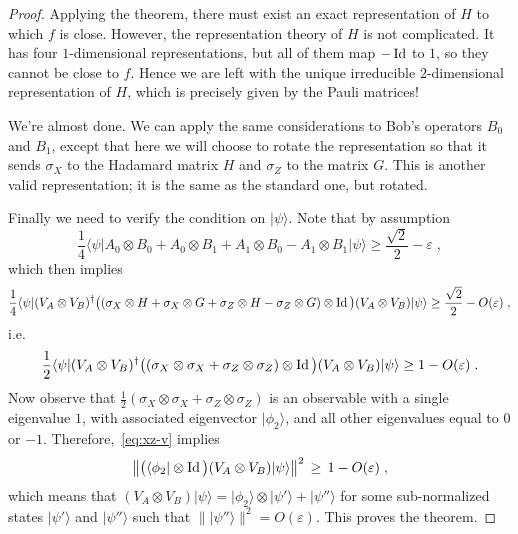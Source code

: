 \documentclass{report}
\theoremstyle{plain}
\theoremstyle{definition}
\theoremstyle{remark}
\newcommand{\ket}[1]{|#1\rangle}
\newcommand{\bra}[1]{\langle#1|}
\newcommand{\Id}{\ensuremath{\mathop{\rm Id}\nolimits}}
\newcommand{\eps}{\varepsilon}
\numberwithin{equation}{subsection}
\begin{document}
\begin{proof}
Applying the theorem, there must exist an exact representation of $H$ to which $f$ is close. However, the representation theory of $H$ is not complicated. It has four $1$-dimensional representations, but all of them map $-\Id$ to $1$, so they cannot be close to $f$. Hence we are left with the unique irreducible $2$-dimensional representation of $H$, which is precisely given by the Pauli matrices!

We're almost done. We can apply the  same considerations to Bob's operators $B_0$ and $B_1$, except that here we will choose to rotate the representation so that it sends $\sigma_X$ to the Hadamard matrix $H$ and $\sigma_Z$ to the matrix $G$. This is another valid representation; it is the same as the standard one, but rotated. 

Finally we need to verify the condition on $\ket{\psi}$. Note that by assumption 
$$ \frac{1}{4}\bra{\psi} A_0 \otimes B_0 + A_0 \otimes B_1 + A_1 \otimes B_0 - A_1\otimes B_1 \ket{\psi} \geq \frac{\sqrt{2}}{2} - \eps\;,$$
which then implies 
$$ \frac{1}{4} \bra{\psi}(V_A\otimes V_B)^\dagger \big( (\sigma_X \otimes H + \sigma_X \otimes G + \sigma_Z \otimes H - \sigma_Z\otimes G)\otimes\Id\big) (V_A\otimes V_B)\ket{\psi} \geq \frac{\sqrt{2}}{2} - O({\eps})\;,$$
i.e. 
\begin{equation}\label{eq:xz-v}
\frac{1}{2}\bra{\psi}(V_A\otimes V_B)^\dagger \big( (\sigma_X \otimes \sigma_X + \sigma_Z \otimes \sigma_Z )\otimes \Id\big)(V_A\otimes V_B)\ket{\psi} \geq 1 - O({\eps})\;.
\end{equation}
Now observe that $\frac{1}{2}(\sigma_X \otimes \sigma_X + \sigma_Z \otimes \sigma_Z )$ is an observable with a single eigenvalue $1$, with associated eigenvector $\ket{\phi_2}$, and all other eigenvalues equal to $0$ or $-1$. Therefore,~\eqref{eq:xz-v} implies 
\[ \big\|\big(\bra{\phi_2}\otimes \Id\big)(V_A\otimes V_B)|\psi\rangle\big\|^2 \,\geq\, 1-O({\eps})\;,\]
which means that $(V_A\otimes V_B)|\psi\rangle = \ket{\phi_2} \otimes \ket{\psi'} + \ket{\psi''}$ for some sub-normalized states $\ket{\psi'}$ and $\ket{\psi''}$ such that $\|\ket{\psi''}\|^2 = O(\eps)$. This proves the theorem. 
\end{proof}
\end{document}

